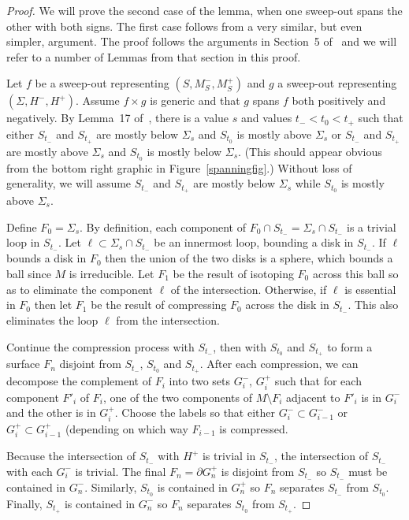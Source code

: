 \documentclass[12pt]{amsart}
\theoremstyle{plain}
\theoremstyle{definition}
\begin{document}
\begin{proof}
We will prove the second case of the lemma, when one sweep-out spans the other with both signs.  The first case follows from a very similar, but even simpler, argument.  The proof follows the arguments in Section~5 of~\cite{me:stabs} and we will refer to a number of Lemmas from that section in this proof.

Let $f$ be a sweep-out representing $(S, M^-_S, M^+_S)$ and $g$ a sweep-out representing $(\Sigma, H^-, H^+)$.  Assume $f \times g$ is generic and that $g$ spans $f$ both positively and negatively.  By Lemma~17 of~\cite{me:stabs}, there is a value $s$ and values $t_- < t_0 < t_+$ such that either $S_{t_-}$ and $S_{t_+}$ are mostly below $\Sigma_s$ and $S_{t_0}$ is mostly above $\Sigma_s$ or $S_{t_-}$ and $S_{t_+}$ are mostly above $\Sigma_s$ and $S_{t_0}$ is mostly below $\Sigma_s$.  (This should appear obvious from the bottom right graphic in Figure~\ref{spanningfig}.)  Without loss of generality, we will assume $S_{t_-}$ and $S_{t_+}$ are mostly below $\Sigma_s$ while $S_{t_0}$ is mostly above $\Sigma_s$.

Define $F_0 = \Sigma_s$.  By definition, each component of $F_0 \cap S_{t_-} = \Sigma_s \cap S_{t_-}$ is a trivial loop in $S_{t_-}$.  Let $\ell \subset \Sigma_s \cap S_{t_-}$ be an innermost loop, bounding a disk in $S_{t_-}$.  If $\ell$ bounds a disk in $F_0$ then the union of the two disks is a sphere, which bounds a ball since $M$ is irreducible.  Let $F_1$ be the result of isotoping $F_0$ across this ball so as to eliminate the component $\ell$ of the intersection.  Otherwise, if $\ell$ is essential in $F_0$ then let $F_1$ be the result of compressing $F_0$ across the disk in $S_{t_-}$.  This also eliminates the loop $\ell$ from the intersection.

Continue the compression process with $S_{t_-}$, then with $S_{t_0}$ and $S_{t_+}$ to form a surface $F_n$ disjoint from $S_{t_-}$, $S_{t_0}$ and $S_{t_+}$.  After each compression, we can decompose the complement of $F_i$ into two sets $G_i^-$, $G_i^+$ such that for each component $F'_i$ of $F_i$, one of the two components of $M \setminus F_i$ adjacent to $F'_i$ is in $G_i^-$ and the other is in $G_i^+$.  Choose the labels so that either $G^-_i \subset G^-_{i-1}$ or $G^+_i \subset G^+_{i-1}$ (depending on which way $F_{i-1}$ is compressed.

Because the intersection of $S_{t_-}$ with $H^+$ is trivial in $S_{t_-}$, the intersection of $S_{t_-}$ with each $G_i^-$ is trivial.  The final $F_n = \partial G_n^+$ is disjoint from $S_{t_-}$ so $S_{t_-}$ must be contained in $G_n^-$.  Similarly, $S_{t_0}$ is contained in $G_n^+$ so $F_n$ separates $S_{t_-}$ from $S_{t_0}$.  Finally, $S_{t_+}$ is contained in $G^-_n$ so $F_n$ separates $S_{t_0}$ from $S_{t_+}$.  


\end{proof}
\end{document}
